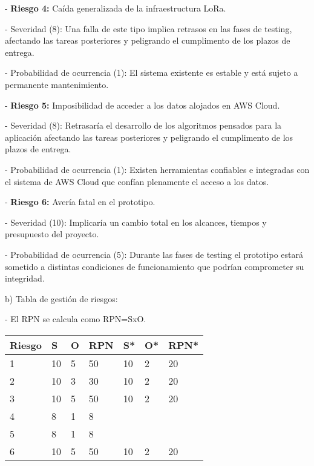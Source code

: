 \documentclass[11pt]{charter}
\begin{document}
- \textbf{Riesgo 4:} Caída generalizada de la infraestructura LoRa.
	
	- Severidad (8): Una falla de este tipo implica retrasos en las fases de testing, afectando las tareas posteriores y peligrando el cumplimento de los plazos de entrega. 
	
	- Probabilidad de ocurrencia (1): El sistema existente es estable y está sujeto a permanente mantenimiento. 
	
- \textbf{Riesgo 5:} Imposibilidad de acceder a los datos alojados en AWS Cloud. 
	
	- Severidad (8): Retrasaría el desarrollo de los algoritmos pensados para la aplicación afectando las tareas posteriores y peligrando el cumplimento de los plazos de entrega. 
	
	- Probabilidad de ocurrencia (1): Existen herramientas confiables e integradas con el sistema de AWS Cloud que confían plenamente el acceso a los datos. 

- \textbf{Riesgo 6:} Avería fatal en el prototipo.
	
	- Severidad (10): Implicaría un cambio total en los alcances, tiempos y presupuesto del proyecto. 
	
	- Probabilidad de ocurrencia (5): Durante las fases de testing el prototipo estará sometido a distintas condiciones de funcionamiento que podrían comprometer su integridad. 

b) Tabla de gestión de riesgos:

- El RPN se calcula como RPN=SxO.

\begin{table}[htpb]
\centering
\begin{tabularx}{\linewidth}{|X|X|X|X|X|X|X|}
\hline
\rowcolor[HTML]{C0C0C0} 
Riesgo & S & O & RPN & S* & O* & RPN* \\ \hline
 1      & 10 & 5  & \cellcolor [HTML] {FF3600} 50 &10  &2   & \cellcolor [HTML] {7CFC4F} 20    \\ \hline
 2      & 10 & 3  & \cellcolor [HTML] {FC8E4F} 30 &10  &2   & \cellcolor [HTML] {7CFC4F} 20    \\ \hline
 3      & 10 & 5  & \cellcolor [HTML] {FF3600} 50 &10  &2   & \cellcolor [HTML] {7CFC4F} 20    \\ \hline
 4      & 8  & 1  & \cellcolor [HTML] {7CFC4F} 8  &  &   & \\ \hline
 5      & 8  & 1  & \cellcolor [HTML] {7CFC4F} 8  &  &   & \\ \hline
 6      & 10 & 5  & \cellcolor [HTML] {FF3600} 50 &10  &2   & \cellcolor [HTML] {7CFC4F} 20   \\ \hline
\end{tabularx}%
\end{table}
\end{document}
